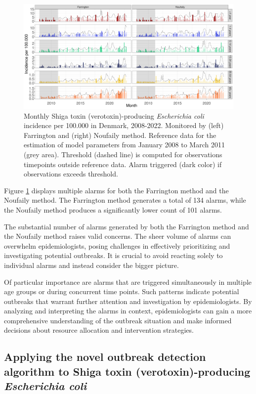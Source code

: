 \documentclass[a4paper,twoside,11pt]{report} %
\theoremstyle{definition}
\theoremstyle{definition}
\theoremstyle{definition}
\theoremstyle{definition}
\theoremstyle{remark}
\begin{document}
\begin{figure}[H]
\includegraphics[width=1\linewidth]{../figures/Compare_stateOfTheArt_STEC} \caption{Monthly Shiga toxin (verotoxin)-producing \textit{Escherichia coli} incidence per 100.000 in Denmark, 2008-2022. Monitored by (left) Farrington and (right) Noufaily method. Reference data for the estimation of model parameters from January 2008 to March 2011 (grey area). Threshold (dashed line) is computed for observations timepoints outside reference data. Alarm triggered (dark color) if observations exceeds threshold.}\label{fig:CompareStateOfTheArtSTEC}
\end{figure}

Figure \ref{fig:CompareStateOfTheArtSTEC} displays multiple alarms for both the Farrington method and the Noufaily method. The Farrington method generates a total of 134 alarms, while the Noufaily method produces a significantly lower count of 101 alarms.

The substantial number of alarms generated by both the Farrington method and the Noufaily method raises valid concerns. The sheer volume of alarms can overwhelm epidemiologists, posing challenges in effectively prioritizing and investigating potential outbreaks. It is crucial to avoid reacting solely to individual alarms and instead consider the bigger picture.

Of particular importance are alarms that are triggered simultaneously in multiple age groups or during concurrent time points. Such patterns indicate potential outbreaks that warrant further attention and investigation by epidemiologists. By analyzing and interpreting the alarms in context, epidemiologists can gain a more comprehensive understanding of the outbreak situation and make informed decisions about resource allocation and intervention strategies.

\subsection{Applying the novel outbreak detection algorithm to Shiga toxin (verotoxin)-producing \textit{Escherichia coli}}
\end{document}
